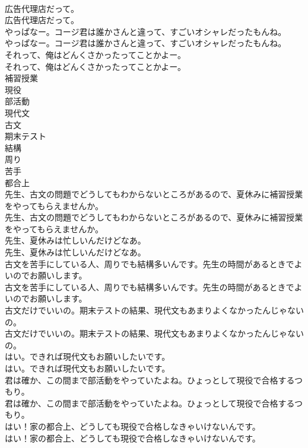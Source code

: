 \documentclass[8pt]{extreport}
\begin{document}
\begin{CJK}{UTF8}{min}
\\	広告代理店だって。	
\\	広告代理店だって。 
\\	やっぱなー。コージ君は誰かさんと違って、すごいオシャレだったもんね。	
\\	やっぱなー。コージ君は誰かさんと違って、すごいオシャレだったもんね。 
\\	それって、俺はどんくさかったってことかよー。	
\\	それって、俺はどんくさかったってことかよー。 
\\	補習授業
\\	現役
\\	部活動
\\	現代文
\\	古文
\\	期末テスト
\\	結構
\\	周り
\\	苦手
\\	都合上
\\	先生、古文の問題でどうしてもわからないところがあるので、夏休みに補習授業をやってもらえませんか。	
\\	先生、古文の問題でどうしてもわからないところがあるので、夏休みに補習授業をやってもらえませんか。 
\\	先生、夏休みは忙しいんだけどなあ。	
\\	先生、夏休みは忙しいんだけどなあ。 
\\	古文を苦手にしている人、周りでも結構多いんです。先生の時間があるときでよいのでお願いします。	
\\	古文を苦手にしている人、周りでも結構多いんです。先生の時間があるときでよいのでお願いします。 
\\	古文だけでいいの。期末テストの結果、現代文もあまりよくなかったんじゃないの。	
\\	古文だけでいいの。期末テストの結果、現代文もあまりよくなかったんじゃないの。 
\\	はい。できれば現代文もお願いしたいです。	
\\	はい。できれば現代文もお願いしたいです。 
\\	君は確か、この間まで部活動をやっていたよね。ひょっとして現役で合格するつもり。	
\\	君は確か、この間まで部活動をやっていたよね。ひょっとして現役で合格するつもり。 
\\	はい！家の都合上、どうしても現役で合格しなきゃいけないんです。	
\\	はい！家の都合上、どうしても現役で合格しなきゃいけないんです。 

\end{CJK}
\end{document}
